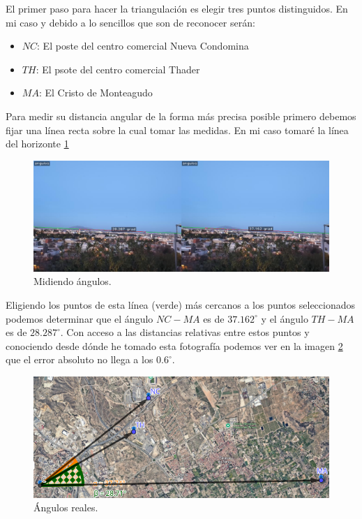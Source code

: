 \documentclass[12pt]{article}
\begin{document}
El primer paso para hacer la triangulación es elegir tres puntos distinguidos. En mi caso y debido a lo sencillos que son de reconocer serán:
\begin{itemize}
    \item[] $NC$: El poste del centro comercial Nueva Condomina
    \item[] $TH$: El psote del centro comercial Thader
    \item[] $MA$: El Cristo de Monteagudo
\end{itemize}
Para medir su distancia angular de la forma más precisa posible primero debemos fijar una línea recta sobre la cual tomar las medidas. En mi caso tomaré la línea del horizonte \ref{fig:paisaje_angulos}
\begin{figure}[H]
    \centering
    \includegraphics[width=1\textwidth]{images_calibracion/Paisaje_angulos.png} 
    \caption{Midiendo ángulos.}
    \label{fig:paisaje_angulos}
\end{figure}
Eligiendo los puntos de esta línea (verde) más cercanos a los puntos seleccionados podemos determinar que el ángulo $NC-MA$ es de $37.162^{\circ}$ y el ángulo $TH-MA$ es de $28.287^{\circ}$. Con acceso a las distancias relativas entre estos puntos y conociendo desde dónde he tomado esta fotografía podemos ver en la imagen \ref{fig:geogebra_angulos} que el error absoluto no llega a los $0.6^{\circ}$. 
\begin{figure}[H]
    \centering
    \includegraphics[width=1\textwidth]{images_calibracion/Angulos_Geogebra.png} 
    \caption{Ángulos reales.}
    \label{fig:geogebra_angulos}
\end{figure}
\end{document}

